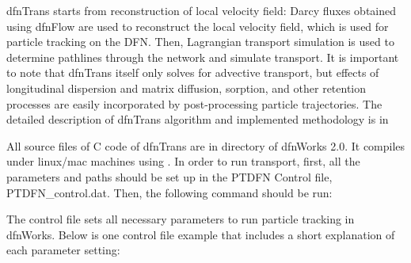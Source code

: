 \documentclass[letterpaper,10pt,english]{sphinxmanual}
\begin{document}
dfnTrans starts from  reconstruction of local velocity field: Darcy fluxes
obtained using dfnFlow are used to reconstruct the local velocity field, which
is used for particle tracking on the DFN. Then, Lagrangian transport simulation
is used to determine pathlines through the network and simulate transport. It is
important to note that dfnTrans itself only solves for advective transport, but
effects of longitudinal dispersion and matrix diffusion, sorption, and other
retention processes are easily incorporated by post-processing particle
trajectories. The detailed description of dfnTrans algorithm and implemented
methodology is in 

All source files of C code of dfnTrans are in  directory of
dfnWorks 2.0. It compiles under linux/mac machines using .  In order
to run transport, first, all the parameters and paths should be set up in the
PTDFN Control file, PTDFN\_control.dat. Then, the following command should be
run:


The control  file sets all necessary parameters to run particle tracking in
dfnWorks.  Below is one control file example that includes a short
explanation of each parameter setting:
\end{document}
